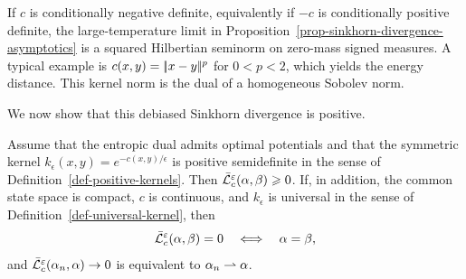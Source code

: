 \begin{rem}
		If $c$ is conditionally negative definite, equivalently if $-c$ is conditionally positive definite, the large-temperature limit in Proposition~\ref{prop-sinkhorn-divergence-asymptotics} is a squared Hilbertian seminorm on zero-mass signed measures. A typical example is $c(x,y)=|\!| x-y |\!|^p$ for $0<p<2$, which yields the energy distance. This kernel norm is the dual of a homogeneous Sobolev norm.
\end{rem}

We now show that this debiased Sinkhorn divergence is positive.

\begin{prop}\label{prop-sinkhorn-positive}
	Assume that the entropic dual admits optimal potentials and that the symmetric kernel $k_\epsilon(x,y)=e^{-c(x,y)/\epsilon}$ is positive semidefinite in the sense of Definition~\ref{def-positive-kernels}. Then $\bar{\mathcal{L}}_c^\varepsilon(\alpha,\beta)\geqslant0$.
	If, in addition, the common state space is compact, $c$ is continuous, and $k_\epsilon$ is universal in the sense of Definition~\ref{def-universal-kernel}, then
	\[
		\bar{\mathcal{L}}_c^\varepsilon(\alpha,\beta)=0
		\quad\Longleftrightarrow\quad
		\alpha=\beta,
	\]
	and $\bar{\mathcal{L}}_c^\varepsilon(\alpha_n,\alpha)\to0$ is equivalent to $\alpha_n\rightharpoonup\alpha$.
\end{prop}

